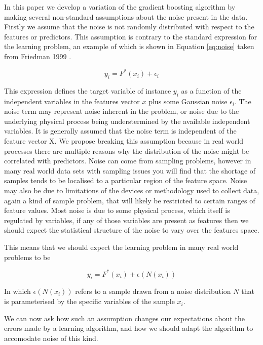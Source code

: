 \documentclass[11pt,twoside,a4paper]{article}
\begin{document}
In this paper we develop a variation of the gradient boosting algorithm by making
several non-standard assumptions about the noise present in the data. 
Firstly we assume that the noise is not randomly distributed with respect to the 
features or predictors. This assumption is contrary to the standard expression for the learning problem, 
an example of which is shown in Equation \ref{eq:noise} taken from Friedman 1999 \cite{Friedman1999}.

\begin{equation}
y_i = F^*(x_i) + \epsilon_i
\label{eq:noise}
\end{equation}

This expression defines the target variable of instance $y_i$ as a function of the independent variables
in the features vector $x$ plus some Gaussian noise $\epsilon_i$. 
The noise term may represent noise inherent in the problem, or noise due to
the underlying physical process being understermined by the available independent variables.
It is generally assumed that the noise term is independent of the feature vector X. 
We propose breaking this assumption because in real world processes there are multiple reasons
why the distribution of the noise might be correlated with predictors. 
Noise can come from sampling problems, however in many real world data sets with sampling issues
you will find that the shortage of samples tends to be localised to a particular region of the 
feature space.
Noise may also be due to limitations of the devices or methodology used to collect data, again
a kind of sample problem, that will likely be restricted to certain ranges of feature values.
Most noise is due to some physical process, which itself is regulated by variables,
if any of those variables are present as features then we should expect the statistical 
structure of the noise to vary over the features space.

This means that we should expect the learning problem in many real world problems to be

\begin{equation}
y_i = F^*(x_i) + \epsilon(N(x_i))
\label{eq:noise}
\end{equation}

In which $\epsilon(N(x_i))$ refers to a sample drawn from a noise distribution $N$ that is 
parameterised by the specific variables of the sample $x_i$.

We can now ask how such an assumption changes our expectations about the errors made by a
learning algorithm, and how we should adapt the algorithm to accomodate noise of this kind.
\end{document}
